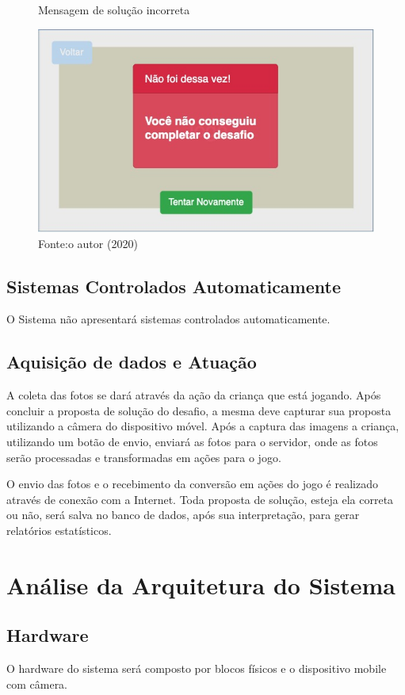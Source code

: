     \begin{figure}[h!]
        \centering
        \caption{Mensagem de solução incorreta}
        \includegraphics[width=12cm]{images/cap3/solucao_incorreta.jpg}
        \caption*{Fonte:o autor (2020)}
        \label{figura:solucao_incorreta}
    \end{figure}
    
    
    \subsection{Sistemas Controlados Automaticamente}
    O Sistema não apresentará sistemas controlados automaticamente.
    
    \subsection{Aquisição de dados e Atuação}
    A coleta das fotos se dará através da ação da criança que está jogando. Após concluir a proposta de solução do desafio, a mesma deve capturar sua proposta utilizando a câmera do dispositivo móvel.
    Após a captura das imagens a criança, utilizando um botão de envio, enviará as fotos para o servidor, onde as fotos serão processadas e transformadas em ações para o jogo.
    
    O envio das fotos e o recebimento da conversão em ações do jogo é realizado através de conexão com a Internet.
    Toda proposta de solução, esteja ela correta ou não, será salva no banco de dados, após sua interpretação, para gerar relatórios estatísticos.


\section{Análise da Arquitetura do Sistema}

    \subsection{Hardware}
    O hardware do sistema será composto por blocos físicos e o dispositivo mobile com câmera.
    
